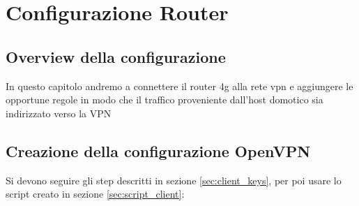 
\chapter{Configurazione Router}

\section{Overview della configurazione}

In questo capitolo andremo a connettere il router 4g alla rete vpn e aggiungere le opportune regole in modo che il traffico proveniente dall'host domotico sia indirizzato verso la VPN

\section{Creazione della configurazione OpenVPN}

Si devono seguire gli step descritti in sezione \ref{sec:client_keys}, per poi usare lo script creato in sezione \ref{sec:script_client}:

